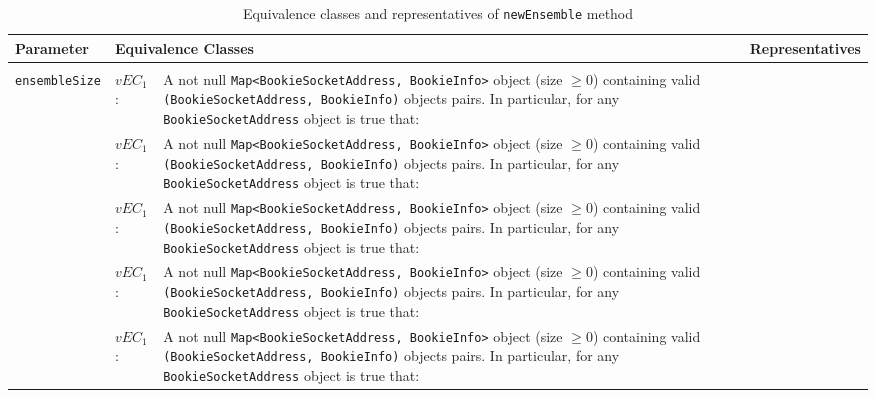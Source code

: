 \documentclass[sigconf]{acmart}
\newcommand{\AndreaTable}[3]{\begin{table*}[h!]
\caption{#1}
\centering
\begin{tabular}{#2}
\toprule
#3
\bottomrule
\end{tabular}
\end{table*}
}
\newcommand{\equivalenceClassesTable}[2]{
\AndreaTable{#1}{llm{8cm}m{8cm}}{#2}
}
\begin{document}
\equivalenceClassesTable{Equivalence classes and representatives of \texttt{newEnsemble} method}{
  
    \textbf{Parameter} & \multicolumn{2}{|l|}{\textbf{Equivalence Classes}} & \textbf{Representatives} \\
    \midrule
    
    \\
	\multirow{25}{*}{\texttt{ensembleSize}} & $vEC_1$: & A not null \texttt{Map<BookieSocketAddress, BookieInfo>} object (size $\geqslant 0$) containing valid \texttt{(BookieSocketAddress, BookieInfo)} objects pairs. \newline In particular, for any \texttt{BookieSocketAddress} object is true that:
  

\\
	\multirow{25}{*}{\texttt{writeQuorumSize}} & $vEC_1$: & A not null \texttt{Map<BookieSocketAddress, BookieInfo>} object (size $\geqslant 0$) containing valid \texttt{(BookieSocketAddress, BookieInfo)} objects pairs. \newline In particular, for any \texttt{BookieSocketAddress} object is true that:
	
	\\
	\multirow{25}{*}{\texttt{ackQuorumSize}} & $vEC_1$: & A not null \texttt{Map<BookieSocketAddress, BookieInfo>} object (size $\geqslant 0$) containing valid \texttt{(BookieSocketAddress, BookieInfo)} objects pairs. \newline In particular, for any \texttt{BookieSocketAddress} object is true that:
	
	\\
	\multirow{25}{*}{\texttt{customMetadata}} & $vEC_1$: & A not null \texttt{Map<BookieSocketAddress, BookieInfo>} object (size $\geqslant 0$) containing valid \texttt{(BookieSocketAddress, BookieInfo)} objects pairs. \newline In particular, for any \texttt{BookieSocketAddress} object is true that:
	
	\\
	\multirow{25}{*}{\texttt{excludeBookies}} & $vEC_1$: & A not null \texttt{Map<BookieSocketAddress, BookieInfo>} object (size $\geqslant 0$) containing valid \texttt{(BookieSocketAddress, BookieInfo)} objects pairs. \newline In particular, for any \texttt{BookieSocketAddress} object is true that:\\


}
\end{document}
